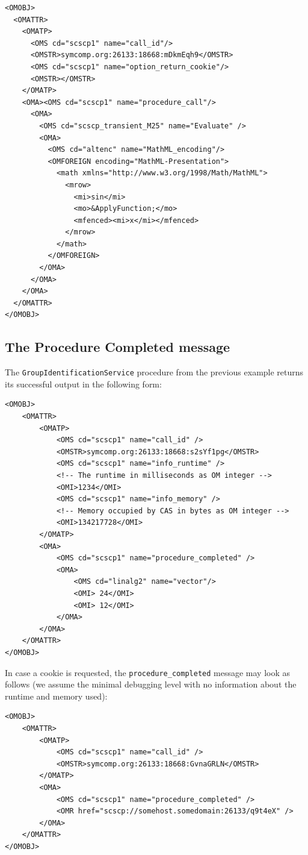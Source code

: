 \documentclass{amsart}
\begin{document}
\begin{verbatim}
<OMOBJ>
  <OMATTR>
    <OMATP>
      <OMS cd="scscp1" name="call_id"/>
      <OMSTR>symcomp.org:26133:18668:mDkmEqh9</OMSTR>
      <OMS cd="scscp1" name="option_return_cookie"/>
      <OMSTR></OMSTR>
    </OMATP>
    <OMA><OMS cd="scscp1" name="procedure_call"/>
      <OMA>
        <OMS cd="scscp_transient_M25" name="Evaluate" />
        <OMA>
          <OMS cd="altenc" name="MathML_encoding"/>
          <OMFOREIGN encoding="MathML-Presentation">
            <math xmlns="http://www.w3.org/1998/Math/MathML">
              <mrow>
                <mi>sin</mi>
                <mo>&ApplyFunction;</mo>
                <mfenced><mi>x</mi></mfenced>
              </mrow>
            </math>
          </OMFOREIGN>
        </OMA>
      </OMA>
    </OMA>
  </OMATTR>
</OMOBJ>
\end{verbatim}

\newpage

\subsection{The Procedure Completed message}
The {\tt GroupIdentificationService} procedure from the previous example
returns its successful output in the following form:

\begin{verbatim}
<OMOBJ>
    <OMATTR>
        <OMATP>
            <OMS cd="scscp1" name="call_id" />
            <OMSTR>symcomp.org:26133:18668:s2sYf1pg</OMSTR>
            <OMS cd="scscp1" name="info_runtime" />
            <!-- The runtime in milliseconds as OM integer -->
            <OMI>1234</OMI>
            <OMS cd="scscp1" name="info_memory" />
            <!-- Memory occupied by CAS in bytes as OM integer -->
            <OMI>134217728</OMI>
        </OMATP>        
        <OMA>
            <OMS cd="scscp1" name="procedure_completed" />
            <OMA>
                <OMS cd="linalg2" name="vector"/>
                <OMI> 24</OMI>
                <OMI> 12</OMI>
            </OMA>
        </OMA>
    </OMATTR>
</OMOBJ>
\end{verbatim}

In case a cookie is requested, the 
\verb|procedure_completed| message may look as follows
(we assume the minimal debugging level with no information 
about the runtime and memory used):

\begin{verbatim}
<OMOBJ>
    <OMATTR>
        <OMATP>
            <OMS cd="scscp1" name="call_id" />
            <OMSTR>symcomp.org:26133:18668:GvnaGRLN</OMSTR>
        </OMATP>
        <OMA> 
            <OMS cd="scscp1" name="procedure_completed" />
            <OMR href="scscp://somehost.somedomain:26133/q9t4eX" />
        </OMA>
    </OMATTR>
</OMOBJ>
\end{verbatim}
\end{document}
